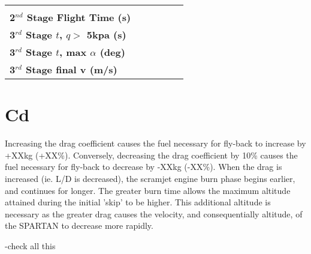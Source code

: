 \begin{table}[ht]
\begin{tabular}{l c c c c c}
	& \secondthirdSeparationLDIspninetypercent
	& \secondthirdSeparationLDIspninetyfivepercent
	& \secondthirdSeparationLDIsponehundredpercent
	& \secondthirdSeparationLDIsponehundredandfivepercent
	& \secondthirdSeparationLDIsponehundredandtenpercent
	\\
	\textbf{2$^{nd}$ Stage Flight Time (s)}
	& \secondFlightTimeIspninetypercent
	& \secondFlightTimeIspninetyfivepercent
	& \secondFlightTimeIsponehundredpercent
	& \secondFlightTimeIsponehundredandfivepercent
	& \secondFlightTimeIsponehundredandtenpercent
	\\
	\textbf{3$^{rd}$ Stage $t$, $q >$ 5kpa (s)}
	& \thirdqOverFiveIspninetypercent
	& \thirdqOverFiveIspninetyfivepercent
	& \thirdqOverFiveIsponehundredpercent
	& \thirdqOverFiveIsponehundredandfivepercent
	& \thirdqOverFiveIsponehundredandtenpercent
	\\
	\textbf{3$^{rd}$ Stage $t$, max $\alpha$ (deg)}
	& \thirdmaxAoAIspninetypercent
	& \thirdmaxAoAIspninetyfivepercent
	& \thirdmaxAoAIsponehundredpercent
	& \thirdmaxAoAIsponehundredandfivepercent
	& \thirdmaxAoAIsponehundredandtenpercent
	\\
	\hline \textbf{3$^{rd}$ Stage final v (m/s)}
	& \thirdcircvIspninetypercent
	& \thirdcircvIspninetyfivepercent
	& \thirdcircvIsponehundredpercent
	& \thirdcircvIsponehundredandfivepercent
	& \thirdcircvIsponehundredandtenpercent
	\\
	\hline 
\end{tabular} 
\end{table}

\section{Cd}

Increasing the drag coefficient causes the fuel necessary for fly-back to increase by +XXkg (+XX\%). Conversely, decreasing the drag coefficient by 10\% causes the fuel necessary for  fly-back to decrease by -XXkg (-XX\%). 
When the drag is increased (ie. L/D is decreased), the scramjet engine burn phase begins earlier, and continues for longer. 
The greater burn time allows the maximum altitude attained during the initial 'skip' to be higher. 
This additional altitude is necessary as the greater drag causes the velocity, and consequentially altitude, of the SPARTAN to decrease more rapidly.

-check all this

